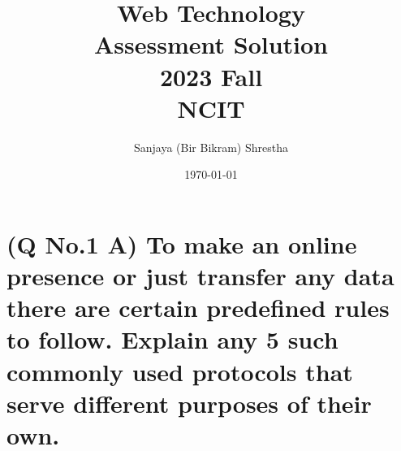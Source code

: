 \documentclass[11pt]{article}
\title{ Web Technology\\ Assessment Solution\\2023 Fall \\ NCIT}
\author{ Sanjaya (Bir Bikram) Shrestha }
\date{\today}
\begin{document}
\maketitle	
\pagestyle{fancy}

\tableofcontents
\pagebreak



\section{(Q No.1 A) To make an online presence or just transfer any data there are certain predefined rules to follow. Explain any 5 such commonly used protocols that serve different purposes of their own.}
\subparagraph{}
\end{document}
